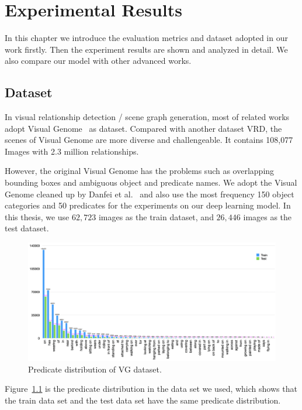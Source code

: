 \chapter{Experimental Results}
\label{chap:experiment}
In this chapter we introduce the evaluation metrics and dataset adopted in our work firstly. Then the experiment results are shown and analyzed in detail. We also compare our model with other advanced works.

\section{Dataset}

In visual relationship detection / scene graph generation, most of related works adopt Visual Genome~\cite{krishna2017visual} as dataset. Compared with another dataset VRD, the scenes of Visual Genome are more diverse and challengeable. It contains 108,077 Images with 2.3 million relationships.

However, the original Visual Genome has the problems such as overlapping bounding boxes and ambiguous object and predicate names. We adopt the Visual Genome cleaned up by Danfei et al.~\cite{xu2017scene}  and also use the most frequency 150 object categories and 50 predicates for the experiments on our deep learning model. In this thesis, we use $ 62,723 $ images as the train dataset, and $ 26,446 $ images as the test dataset.

\begin{figure}[!hbtp]
	\centering
	\includegraphics[width=0.9\linewidth]{figures/predicates}
	\caption[Predicate distribution of VG dataset]{Predicate distribution of VG dataset.}
	\label{fig:predicates}
\end{figure}

Figure~\ref{fig:predicates} is the predicate distribution in the data set we used, which shows that the train data set and the test data set have the same predicate distribution.

